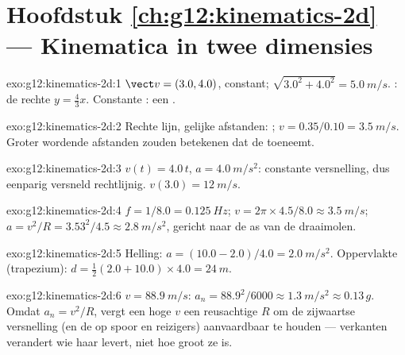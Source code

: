 \section*{Hoofdstuk \ref{ch:g12:kinematics-2d} --- Kinematica in twee dimensies}

\begin{solution}{exo:g12:kinematics-2d:1}
$\vect v = (3.0, 4.0)$, constant; 
$\sqrt{3.0^2 + 4.0^2} = \qty{5.0}{m/s}$. : de rechte
$y = \tfrac43 x$. Constante : een .
\end{solution}

\begin{solution}{exo:g12:kinematics-2d:2}
Rechte lijn, gelijke afstanden: ;
$v = 0.35/0.10 = \qty{3.5}{m/s}$. Groter wordende afstanden zouden
betekenen dat de  toeneemt.
\end{solution}

\begin{solution}{exo:g12:kinematics-2d:3}
$v(t) = 4.0\,t$, $a = \qty{4.0}{m/s^2}$: constante versnelling, dus
eenparig versneld rechtlijnig. $v(3.0) = \qty{12}{m/s}$.
\end{solution}

\begin{solution}{exo:g12:kinematics-2d:4}
$f = 1/8.0 = \qty{0.125}{Hz}$;
$v = 2\pi \times 4.5/8.0 \approx \qty{3.5}{m/s}$;
$a = v^2/R = 3.53^2/4.5 \approx \qty{2.8}{m/s^2}$, gericht naar de as van
de draaimolen.
\end{solution}

\begin{solution}{exo:g12:kinematics-2d:5}
Helling: $a = (10.0 - 2.0)/4.0 = \qty{2.0}{m/s^2}$. Oppervlakte
(trapezium): $d = \tfrac12 (2.0 + 10.0) \times 4.0 = \qty{24}{m}$.
\end{solution}

\begin{solution}{exo:g12:kinematics-2d:6}
$v = \qty{88.9}{m/s}$: $a_n = 88.9^2/6000 \approx \qty{1.3}{m/s^2}
\approx 0.13\,g$. Omdat $a_n = v^2/R$, vergt een hoge $v$ een reusachtige
$R$ om de zijwaartse versnelling (en de  op spoor en reizigers)
aanvaardbaar te houden --- verkanten verandert wie haar levert, niet hoe
groot ze is.
\end{solution}

